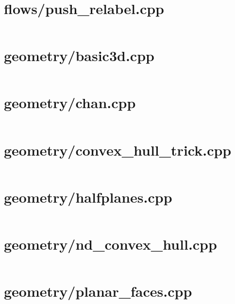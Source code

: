 \newpage
\section{flows/push\_relabel.cpp}
\fontsize{7.9}{8.5}\selectfont
\inputminted[numbersep=1pt,linenos,breaklines]{c++}{/home/ifsmirnov/olymp/teambook/tmp.qSsNloJNks/tmp.Nvb781weAO}

\newpage
\section{geometry/basic3d.cpp}
\fontsize{7.9}{8.5}\selectfont
\inputminted[numbersep=1pt,linenos,breaklines]{c++}{/home/ifsmirnov/olymp/teambook/tmp.qSsNloJNks/tmp.3mmIgqIr09}

\newpage
\section{geometry/chan.cpp}
\fontsize{7.9}{8.5}\selectfont
\inputminted[numbersep=1pt,linenos,breaklines]{c++}{/home/ifsmirnov/olymp/teambook/tmp.qSsNloJNks/tmp.vqBHk0kzsa}

\newpage
\section{geometry/convex\_hull\_trick.cpp}
\fontsize{7.9}{8.5}\selectfont
\inputminted[numbersep=1pt,linenos,breaklines]{c++}{/home/ifsmirnov/olymp/teambook/tmp.qSsNloJNks/tmp.jOFNI74M2w}

\section{geometry/halfplanes.cpp}
\fontsize{7.9}{8.5}\selectfont
\inputminted[numbersep=1pt,linenos,breaklines]{c++}{/home/ifsmirnov/olymp/teambook/tmp.qSsNloJNks/tmp.LpPLcbnLLc}

\newpage
\section{geometry/nd\_convex\_hull.cpp}
\fontsize{7.9}{8.5}\selectfont
\inputminted[numbersep=1pt,linenos,breaklines]{c++}{/home/ifsmirnov/olymp/teambook/tmp.qSsNloJNks/tmp.wtj0o32yCv}

\newpage
\section{geometry/planar\_faces.cpp}
\fontsize{7.9}{8.5}\selectfont
\inputminted[numbersep=1pt,linenos,breaklines]{c++}{/home/ifsmirnov/olymp/teambook/tmp.qSsNloJNks/tmp.tIfAF1Na19}

